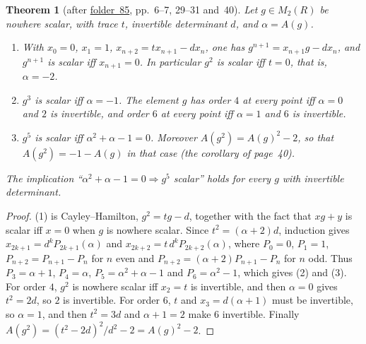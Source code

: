 \documentclass[11pt,a4paper]{amsart}
\newtheorem{theorem}{Theorem}[section]
\theoremstyle{definition}
\theoremstyle{remark}
\newcommand{\fac}[1]{\href{https://grothendieck.umontpellier.fr/#1.pdf}{folder~#1}}
\begin{document}
\begin{theorem}[after \fac{85}, pp.~6--7, 29--31 and~40]\label{thm:orders}
Let $g \in M_2(R)$ be nowhere scalar, with trace $t$, invertible determinant $d$, and $\alpha = A(g)$.
\begin{enumerate}
\item With $x_0 = 0$, $x_1 = 1$, $x_{n+2} = tx_{n+1} - dx_n$, one has $g^{n+1} = x_{n+1}g - dx_n$, and $g^{n+1}$ is scalar iff $x_{n+1} = 0$. In particular $g^2$ is scalar iff $t = 0$, that is, $\alpha = -2$.
\item $g^3$ is scalar iff $\alpha = -1$. The element $g$ has order $4$ at every point iff $\alpha = 0$ and $2$ is invertible, and order $6$ at every point iff $\alpha = 1$ and $6$ is invertible.
\item $g^5$ is scalar iff $\alpha^2 + \alpha - 1 = 0$. Moreover $A(g^2) = A(g)^2 - 2$, so that $A(g^2) = -1 - A(g)$ in that case (the corollary of page~40).
\end{enumerate}
The implication ``$\alpha^2 + \alpha - 1 = 0 \Rightarrow g^5$ scalar'' holds for every $g$ with invertible determinant.
\end{theorem}

\begin{proof}
(1) is Cayley--Hamilton, $g^2 = tg - d$, together with the fact that $xg + y$ is scalar iff $x = 0$ when $g$ is nowhere scalar. Since $t^2 = (\alpha + 2)d$, induction gives $x_{2k+1} = d^kP_{2k+1}(\alpha)$ and $x_{2k+2} = t\,d^kP_{2k+2}(\alpha)$, where $P_0 = 0$, $P_1 = 1$, $P_{n+2} = P_{n+1} - P_n$ for $n$ even and $P_{n+2} = (\alpha + 2)P_{n+1} - P_n$ for $n$ odd. Thus $P_3 = \alpha + 1$, $P_4 = \alpha$, $P_5 = \alpha^2 + \alpha - 1$ and $P_6 = \alpha^2 - 1$, which gives (2) and (3). For order $4$, $g^2$ is nowhere scalar iff $x_2 = t$ is invertible, and then $\alpha = 0$ gives $t^2 = 2d$, so $2$ is invertible. For order $6$, $t$ and $x_3 = d(\alpha + 1)$ must be invertible, so $\alpha = 1$, and then $t^2 = 3d$ and $\alpha + 1 = 2$ make $6$ invertible. Finally $A(g^2) = (t^2 - 2d)^2/d^2 - 2 = A(g)^2 - 2$.
\end{proof}
\end{document}
